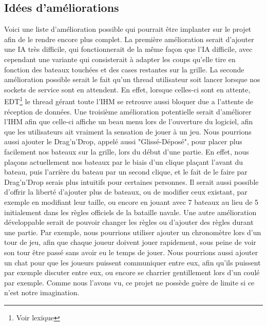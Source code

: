 \subsection{Idées d'améliorations}
	Voici une liste d'amélioration possible qui pourrait être implanter sur le projet afin de le rendre encore plus complet.\newline
	La première amélioration serait d'ajouter une IA très difficile, qui fonctionnerait de la même façon que l'IA difficile, avec cependant une variante qui consisterait à adapter les coups qu'elle tire en fonction des bateaux touchées et des cases restantes sur la grille.\newline
	La seconde amélioration possible serait le fait qu'un thread utilisateur soit lancer lorsque nos sockets de service sont en attendent. En effet, lorsque celles-ci sont en attente, EDT\footnote{Voir lexique} le thread gérant toute l'IHM se retrouve aussi bloquer due a l'attente de réception de données.\newline
	Une troisième amélioration potentielle serait d'améliorer l'IHM afin que celle-ci affiche un beau menu lors de l'ouverture du logiciel, afin que les utilisateurs ait vraiment la sensation de jouer à un jeu.\newline
	Nous pourrions aussi ajouter le Drag'n'Drop, appelé aussi "Glissé-Déposé", pour placer plus facilement nos bateaux sur la grille, lors du début d'une partie. En effet, nous plaçons actuellement nos bateaux par le biais d'un clique plaçant l'avant du bateau, puis l'arrière du bateau par un second clique, et le fait de le faire par Drag'n'Drop serais plus intuitifs pour certaines personnes.\newline
	Il serait aussi possible d'offrir la liberté d'ajouter plus de bateaux, ou de modifier ceux existant, par exemple en modifiant leur taille, ou encore en jouant avec 7 bateaux au lieu de 5 initialement dans les règles officiels de la bataille navale.\newline
	Une autre amélioration développable serait de pouvoir changer les règles ou d'ajouter des règles durant une partie. Par exemple, nous pourrions utiliser ajouter un chronomètre lors d'un tour de jeu, afin que chaque joueur doivent jouer rapidement, sous peine de voir son tour être passé sans avoir eu le temps de jouer.
	Nous pourrions aussi ajouter un chat pour que les joueurs puissent communiquer entre eux, afin qu'ils puissent par exemple discuter entre eux, ou encore se charrier gentillement lors d'un coulé par exemple.\newline
	Comme nous l'avons vu, ce projet ne possède guère de limite si ce n'est notre imagination.\newline

